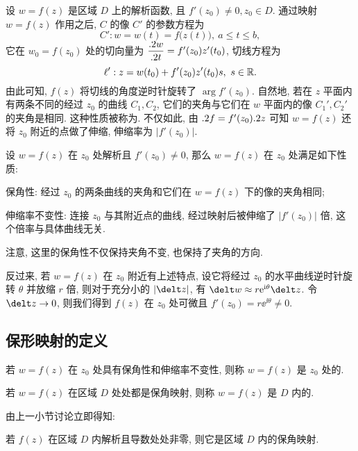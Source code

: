 设 $w=f(z)$ 是区域 $D$ 上的解析函数, 且 $f'(z_0)\neq 0,z_0\in D$.
通过映射 $w=f(z)$ 作用之后, $C$ 的像 $C'$ 的参数方程为
\[
  C':w=w(t)=f\bigl(z(t)\bigr),\ a\le t\le b,
\]
它在 $w_0=f(z_0)$ 处的切向量为 $\dfrac{.2 w}{.2 t}=f'(z_0) z'(t_0)$, 切线方程为
\[
  \ell': z=w(t_0)+f'(z_0) z'(t_0)s,\ s\in{\mathbb{R}}.
\]
由此可知, $f(z)$ 将切线的角度逆时针旋转了 $\arg f'(z_0)$.
自然地, 若在 $z$ 平面内有两条不同的经过 $z_0$ 的曲线 $C_1,C_2$, 它们的夹角与它们在 $w$ 平面内的像 $C_1',C_2'$ 的夹角是相同.
这种性质被称为.
不仅如此, 由 $.2 f=f'(z_0).2 z$ 可知 $w=f(z)$ 还将 $z_0$ 附近的点做了伸缩, 伸缩率为 $|f'(z_0)|$.

\begin{theorem}
  设 $w=f(z)$ 在 $z_0$ 处解析且 $f'(z_0)\neq0$, 那么 $w=f(z)$ 在 $z_0$ 处满足如下性质:
  \begin{enuma}
    \item 保角性: 经过 $z_0$ 的两条曲线的夹角和它们在 $w=f(z)$ 下的像的夹角相同;
    \item 伸缩率不变性: 连接 $z_0$ 与其附近点的曲线, 经过映射后被伸缩了 $|f'(z_0)|$ 倍, 这个倍率与具体曲线无关.\footnotemark
  \end{enuma}
\end{theorem}

注意, 这里的保角性不仅保持夹角不变, 也保持了夹角的方向.

反过来, 若 $w=f(z)$ 在 $z_0$ 附近有上述特点, 设它将经过 $z_0$ 的水平曲线逆时针旋转 $\theta$ 并放缩 $r$ 倍, 则对于充分小的 $|{\delt z}|$, 有 $\delt w\approx r\ee^{\ii\theta}\delt z$.
令 $\delt z\ra 0$, 则我们得到 $f(z)$ 在 $z_0$ 处可微且 $f'(z_0)=r\ee^{\ii\theta}\neq0$.


\subsection{保形映射的定义}

\begin{definition}
  \begin{enuma}
    \item 若 $w=f(z)$ 在 $z_0$ 处具有保角性和伸缩率不变性, 则称 $w=f(z)$ 是 $z_0$ 处的.
    \item 若 $w=f(z)$ 在区域 $D$ 处处都是保角映射, 则称 $w=f(z)$ 是 $D$ 内的.
  \end{enuma}
\end{definition}

由上一小节讨论立即得知:
\begin{theorem}
  若 $f(z)$ 在区域 $D$ 内解析且导数处处非零, 则它是区域 $D$ 内的保角映射.
\end{theorem}

